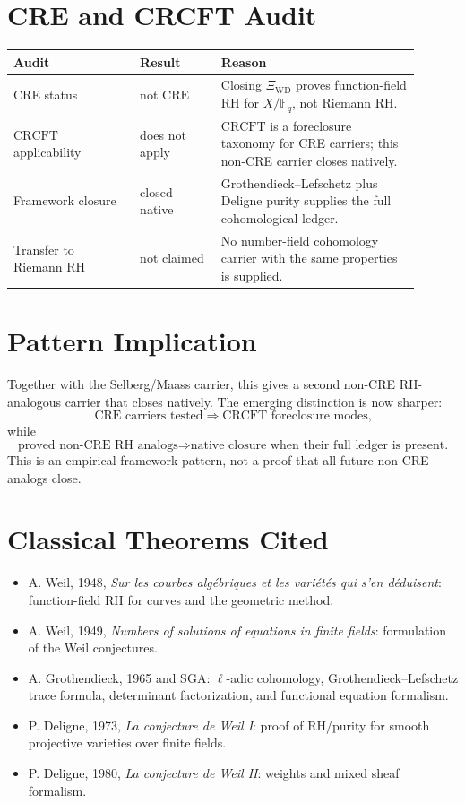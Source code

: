 \documentclass[11pt]{article}
\newcommand{\Fq}{\mathbb F_q}
\newcommand{\XiWD}{\Xi_{\mathrm{WD}}}
\newcommand{\CRE}{\mathrm{CRE}}
\newcommand{\CRCFT}{\mathrm{CRCFT}}
\begin{document}
\section*{CRE and CRCFT Audit}

\begin{center}
\begin{tabular}{p{0.28\linewidth}p{0.18\linewidth}p{0.44\linewidth}}
\toprule
Audit & Result & Reason\\
\midrule
CRE status & not \(\CRE\)
& Closing \(\XiWD\) proves function-field RH for \(X/\Fq\), not Riemann RH.\\
\(\CRCFT\) applicability & does not apply
& \(\CRCFT\) is a foreclosure taxonomy for CRE carriers; this non-CRE carrier closes natively.\\
Framework closure & closed native
& Grothendieck--Lefschetz plus Deligne purity supplies the full cohomological ledger.\\
Transfer to Riemann RH & not claimed
& No number-field cohomology carrier with the same properties is supplied.\\
\bottomrule
\end{tabular}
\end{center}

\section*{Pattern Implication}

Together with the Selberg/Maass carrier, this gives a second non-CRE
RH-analogous carrier that closes natively.  The emerging distinction is now
sharper:
\[
\text{CRE carriers tested} \Rightarrow \CRCFT\text{ foreclosure modes,}
\]
while
\[
\text{proved non-CRE RH analogs} \Rightarrow \text{native closure when their full ledger is present.}
\]
This is an empirical framework pattern, not a proof that all future non-CRE
analogs close.

\section*{Classical Theorems Cited}

\begin{itemize}
\item A. Weil, 1948, \emph{Sur les courbes algébriques et les variétés qui
s'en déduisent}: function-field RH for curves and the geometric method.
\item A. Weil, 1949, \emph{Numbers of solutions of equations in finite
fields}: formulation of the Weil conjectures.
\item A. Grothendieck, 1965 and SGA: \(\ell\)-adic cohomology,
Grothendieck--Lefschetz trace formula, determinant factorization, and
functional equation formalism.
\item P. Deligne, 1973, \emph{La conjecture de Weil I}: proof of RH/purity
for smooth projective varieties over finite fields.
\item P. Deligne, 1980, \emph{La conjecture de Weil II}: weights and mixed
sheaf formalism.
\end{itemize}
\end{document}
